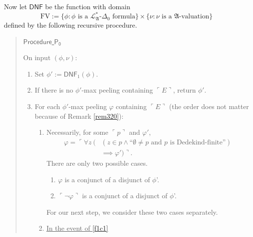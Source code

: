 \documentclass[12pt, twoside]{memoir}
\numberwithin{equation}{section}
\theoremstyle{definition}
\theoremstyle{remark}
\theoremstyle{definition}
\theoremstyle{definition}
\theoremstyle{definition}
\theoremstyle{remark}
\begin{document}
Now let $\mathsf{DNF}$ be the function with domain
\begin{equation*}
    \mathrm{FV} := \{\phi: \phi \text{ is a } \mathcal{L}^{*}_{\mathfrak{A}}\text{-}\Delta_0 \text{ formula}\} \times \{\nu : \nu \text{ is a } \mathfrak{A}\text{-valuation}\} 
\end{equation*} 
defined by the following recursive procedure.
\begin{quote}
    \underline{$\mathsf{Procedure}$ $\mathsf{P_0}$}

    On input $(\phi, \nu)$:
    \begin{enumerate}[label=(\arabic*)]
        \item Set $\phi' := \mathsf{DNF}_1(\phi)$.
        \item If there is no $\phi'$-max peeling containing $\ulcorner E \urcorner$, return $\phi'$.
        \item For each $\phi'$-max peeling $\varphi$ containing $\ulcorner E \urcorner$ (the order does not matter because of Remark \ref{rem320}):
        \begin{enumerate}[label=(F\arabic*), leftmargin=30pt]
            \item Necessarily, for some $\ulcorner p \urcorner$ and $\varphi'$,
                \begin{align*}
                    \varphi = \ulcorner \forall z \ ( & (z \in p \wedge \text{``}\emptyset \neq p \text{ and } p \text{ is Dedekind-finite''}) \\
                    & \implies \varphi') \urcorner \text{.}
                \end{align*}
                There are only two possible cases.
                \begin{enumerate}[label=Case \arabic*:, leftmargin=50pt]
                    \item\label{f1c1} $\varphi$ is a conjunct of a disjunct of $\phi$'.
                    \item\label{f1c2} $\ulcorner \neg \varphi \urcorner$ is a conjunct of a disjunct of $\phi$'.
                \end{enumerate}
                For our next step, we consider these two cases separately.
            
            \item\label{step3} \underline{In the event of \ref{f1c1}}
            

\end{enumerate}
\end{enumerate}
\end{quote}
\end{document}
